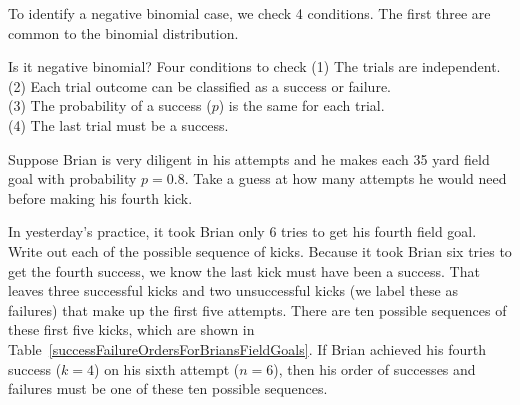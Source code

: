 To identify a negative binomial case, we check 4 conditions. The first three are common to the binomial distribution.

\begin{onebox}{Is it negative binomial? Four conditions to check}
(1) The trials are independent. \\
(2) Each trial outcome can be classified as a success or failure. \\
(3) The probability of a success ($p$) is the same for each trial. \\
(4) The last trial must be a success.
\end{onebox}

\begin{exercisewrap}
\begin{nexercise}
Suppose Brian is very diligent in his attempts and he makes each 35 yard field goal with probability $p=0.8$. Take a guess at how many attempts he would need before making his fourth kick.\footnotemark
\end{nexercise}
\end{exercisewrap}

\begin{examplewrap}
\begin{nexample}{In yesterday's practice, it took Brian only 6 tries to get his fourth field goal. Write out each of the possible sequence of kicks.} \label{eachSeqOfSixTriesToGetFourSuccesses}
Because it took Brian six tries to get the fourth success, we know the last kick must have been a success. That leaves three successful kicks and two unsuccessful kicks (we label these as failures) that make up the first five attempts. There are ten possible sequences of these first five kicks, which are shown in Table~\ref{successFailureOrdersForBriansFieldGoals}. If Brian achieved his fourth success ($k=4$) on his sixth attempt ($n=6$), then his order of successes and failures must be one of these ten possible sequences.
\end{nexample}
\end{examplewrap}

